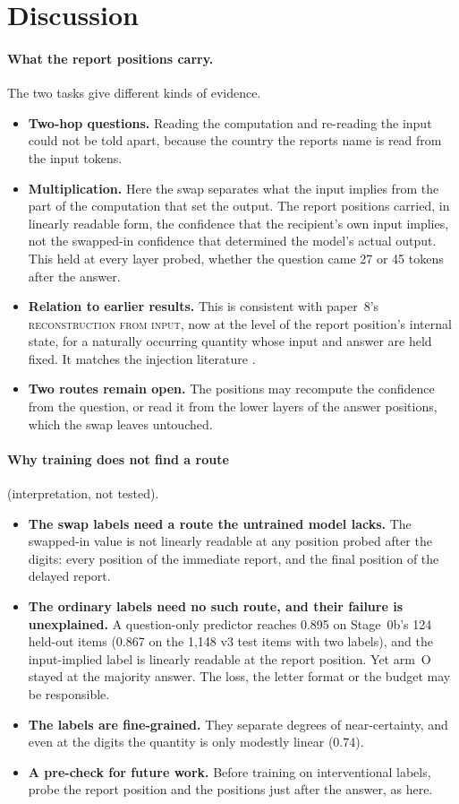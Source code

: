 \documentclass[11pt]{article}
\newcommand{\verdict}[1]{\textsc{\MakeLowercase{#1}}}
\begin{document}
\section{Discussion}

\paragraph{What the report positions carry.} The two tasks give different kinds of evidence.
\begin{itemize}
\item \textbf{Two-hop questions.} Reading the computation and re-reading the input could not be told apart, because the country the reports name is read from the input tokens.
\item \textbf{Multiplication.} Here the swap separates what the input implies from the part of the computation that set the output. The report positions carried, in linearly readable form, the confidence that the recipient's own input implies, not the swapped-in confidence that determined the model's actual output. This held at every layer probed, whether the question came 27 or 45 tokens after the answer.
\item \textbf{Relation to earlier results.} This is consistent with paper~8's \verdict{RECONSTRUCTION FROM INPUT}, now at the level of the report position's internal state, for a naturally occurring quantity whose input and answer are held fixed. It matches the injection literature \citep{ferrara2026owmi,hatua2026verbalization}.
\item \textbf{Two routes remain open.} The positions may recompute the confidence from the question, or read it from the lower layers of the answer positions, which the swap leaves untouched.
\end{itemize}

\paragraph{Why training does not find a route} (interpretation, not tested).
\begin{itemize}
\item \textbf{The swap labels need a route the untrained model lacks.} The swapped-in value is not linearly readable at any position probed after the digits: every position of the immediate report, and the final position of the delayed report.
\item \textbf{The ordinary labels need no such route, and their failure is unexplained.} A question-only predictor reaches 0.895 on Stage~0b's 124 held-out items (0.867 on the 1,148 v3 test items with two labels), and the input-implied label is linearly readable at the report position. Yet arm~O stayed at the majority answer. The loss, the letter format or the budget may be responsible.
\item \textbf{The labels are fine-grained.} They separate degrees of near-certainty, and even at the digits the quantity is only modestly linear (0.74).
\item \textbf{A pre-check for future work.} Before training on interventional labels, probe the report position and the positions just after the answer, as here.
\end{itemize}
\end{document}
